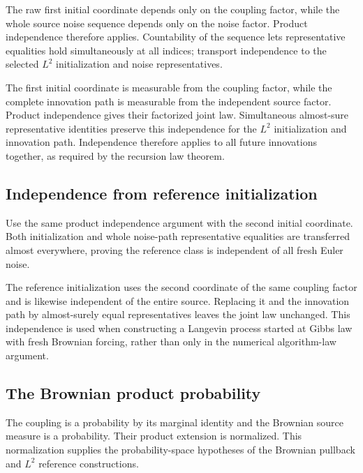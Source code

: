 \documentclass[11pt,a4paper]{article}
\begin{document}
The raw first initial coordinate depends only on the coupling factor, while the whole source noise sequence depends only on the noise factor. Product independence therefore applies. Countability of the sequence lets representative equalities hold simultaneously at all indices; transport independence to the selected \(L^2\) initialization and noise representatives.



The first initial coordinate is measurable from the coupling factor, while the complete innovation path is measurable from the independent source factor. Product independence gives their factorized joint law. Simultaneous almost-sure representative identities preserve this independence for the \(L^2\) initialization and innovation path. Independence therefore applies to all future innovations together, as required by the recursion law theorem.


\subsection{\texorpdfstring{Independence from reference initialization}{Independence from reference initialization}}


Use the same product independence argument with the second initial coordinate. Both initialization and whole noise-path representative equalities are transferred almost everywhere, proving the reference class is independent of all fresh Euler noise.



The reference initialization uses the second coordinate of the same coupling factor and is likewise independent of the entire source. Replacing it and the innovation path by almost-surely equal representatives leaves the joint law unchanged. This independence is used when constructing a Langevin process started at Gibbs law with fresh Brownian forcing, rather than only in the numerical algorithm-law argument.


\subsection{\texorpdfstring{The Brownian product probability}{The Brownian product probability}}


The coupling is a probability by its marginal identity and the Brownian source measure is a probability. Their product extension is normalized. This normalization supplies the probability-space hypotheses of the Brownian pullback and \(L^2\) reference constructions.
\end{document}
